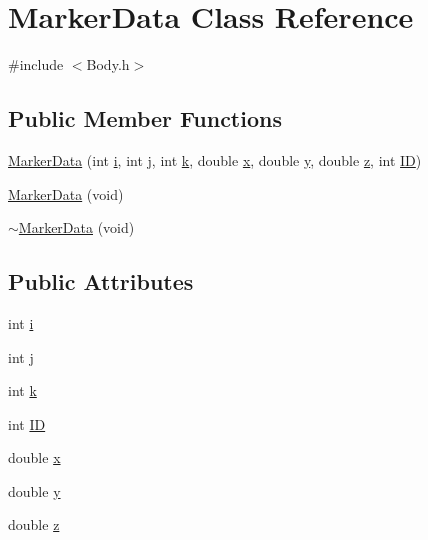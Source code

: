 \hypertarget{class_marker_data}{}\section{Marker\+Data Class Reference}
\label{class_marker_data}


{\ttfamily \#include $<$Body.\+h$>$}

\subsection*{Public Member Functions}
\begin{DoxyCompactItemize}
\item 
\hyperlink{class_marker_data_a6893b09af012bdf7ab510f8b491ca40e}{Marker\+Data} (int \hyperlink{class_marker_data_abb9f15d2132f7007cf0612d53cd969db}{i}, int \hyperlink{class_marker_data_ae48473a1571656cf8f02403cb42a4adc}{j}, int \hyperlink{class_marker_data_a66183b4e9a166279551f4c180d0d71c8}{k}, double \hyperlink{class_marker_data_aade1e2f618efa75989831f028db027cd}{x}, double \hyperlink{class_marker_data_a9b10ce07e886a94fc10e097b2cef2265}{y}, double \hyperlink{class_marker_data_adc00ff164746747a7b379a94abf8a2df}{z}, int \hyperlink{class_marker_data_aae16e1f3245f8ef95ed6170e3775669d}{ID})
\item 
\hyperlink{class_marker_data_a9314e10d84afacc7c6eb6e1fec9c8cf7}{Marker\+Data} (void)
\item 
\hyperlink{class_marker_data_aa2f67eda451a48ab5cc4162e12b675e0}{$\sim$\+Marker\+Data} (void)
\end{DoxyCompactItemize}
\subsection*{Public Attributes}
\begin{DoxyCompactItemize}
\item 
int \hyperlink{class_marker_data_abb9f15d2132f7007cf0612d53cd969db}{i}
\item 
int \hyperlink{class_marker_data_ae48473a1571656cf8f02403cb42a4adc}{j}
\item 
int \hyperlink{class_marker_data_a66183b4e9a166279551f4c180d0d71c8}{k}
\item 
int \hyperlink{class_marker_data_aae16e1f3245f8ef95ed6170e3775669d}{ID}
\item 
double \hyperlink{class_marker_data_aade1e2f618efa75989831f028db027cd}{x}
\item 
double \hyperlink{class_marker_data_a9b10ce07e886a94fc10e097b2cef2265}{y}
\item 
double \hyperlink{class_marker_data_adc00ff164746747a7b379a94abf8a2df}{z}
\end{DoxyCompactItemize}


